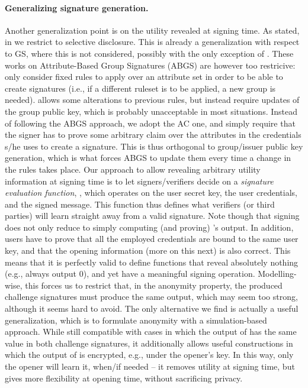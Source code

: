 \paragraph{Generalizing signature generation.} %
Another generalization point is on the utility revealed at signing time. As
stated, in \GSAC we restrict to selective disclosure. This is already a
generalization with respect to GS, where this is not considered, possibly with
the only exception of \cite{khad07a,khad07b,emo09,aa14}. These works on
Attribute-Based Group Signatures (ABGS) are however too restricive:
\cite{khad07a,khad07b,aa14} only consider fixed rules to apply over an
attribute set in order to be able to create signatures (i.e., if a different
ruleset is to be applied, a new group is needed). \cite{emo09} allows some
alterations to previous rules, but instead require updates of the group public
key, which is probably unacceptable in most situations. Instead of following the
ABGS approach, we adopt the AC one, and simply require that the signer has to
prove some arbitrary claim over the attributes in the credentials s/he uses to
create a signature. This is thus orthogonal to group/issuer public key
generation, which is what forces ABGS to update them every time a change in the
rules takes place. Our approach to allow revealing arbitrary utility information
at signing time is to let signers/verifiers decide on a \emph{signature
  evaluation function}, \feval, which operates on the user secret key, the
user credentials, and the signed message. This \feval function thus defines what
verifiers (or third parties) will learn straight away from a valid signature.
Note though that signing does not only reduce to simply computing (and proving)
\feval's output. In addition, users have to prove that all the employed
credentials are bound to the same user key, and that the opening information
(more on this next) is also correct. This means that it is perfectly valid to
define \feval functions that reveal absolutely nothing (e.g., always output
$0$), and yet have a meaningful signing operation. Modelling-wise, this forces
us to restrict that, in the anonymity property, the produced challenge
signatures must produce the same \feval output, which may seem too strong,
although it seems hard to avoid. The only alternative we find is actually a
useful generalization, which is to formulate anonymity with a simulation-based
approach. While still compatible with cases in which the output of \feval has
the same value in both challenge signatures, it additionally allows useful
constructions in which the output of \feval is encrypted, e.g., under the
opener's key. In this way, only the opener will learn it, when/if needed -- it
removes utility at signing time, but gives more flexibility at opening time,
without sacrificing privacy.

